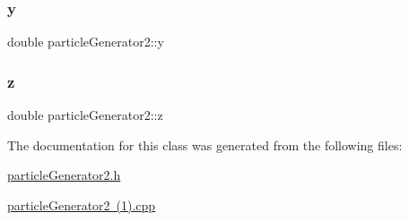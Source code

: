 \subsubsection{\texorpdfstring{y}{y}}
{\footnotesize\ttfamily double particle\+Generator2\+::y}

\mbox{\label{classparticle_generator2_a3eec5d7fc847bac45ec9daf44363b462}} 
\subsubsection{\texorpdfstring{z}{z}}
{\footnotesize\ttfamily double particle\+Generator2\+::z}



The documentation for this class was generated from the following files\+:\begin{DoxyCompactItemize}
\item 
\mbox{\hyperlink{particle_generator2_8h}{particle\+Generator2.\+h}}\item 
\mbox{\hyperlink{particle_generator2_01_071_08_8cpp}{particle\+Generator2 (1).\+cpp}}\end{DoxyCompactItemize}
